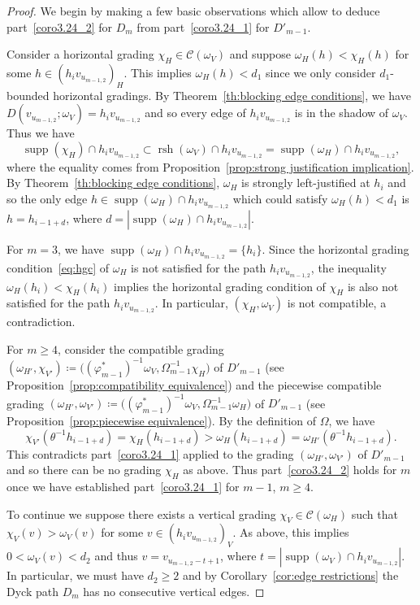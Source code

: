 \documentclass[10pt]{amsart}
\theoremstyle{definition}
\newcommand{\cC}{\mathcal{C}}
\DeclareMathOperator{\supp}{supp}
\DeclareMathOperator{\rsh}{rsh}
\begin{document}
\begin{proof}
 We begin by making a few basic observations which allow to deduce part~\ref{coro3.24_2} for $D_m$ from part~\ref{coro3.24_1} for $D'_{m-1}$.
 
 Consider a horizontal grading $\chi_H\in\cC(\omega_V)$ and suppose $\omega_H(h)<\chi_H(h)$ for some $h\in(h_iv_{u_{m-1,2}})_H$.
 This implies $\omega_H(h)<d_1$ since we only consider $d_1$-bounded horizontal gradings.
 By Theorem~\ref{th:blocking edge conditions}, we have $D(v_{u_{m-1,2}};\omega_V)=h_iv_{u_{m-1,2}}$ and so every edge of $h_iv_{u_{m-1,2}}$ is in the shadow of $\omega_V$.
 Thus we have 
 \[\supp(\chi_H)\cap h_iv_{u_{m-1,2}}\subset\rsh(\omega_V)\cap h_iv_{u_{m-1,2}}=\supp(\omega_H)\cap h_iv_{u_{m-1,2}},\]
 where the equality comes from Proposition~\ref{prop:strong justification implication}.
 By Theorem~\ref{th:blocking edge conditions}, $\omega_H$ is strongly left-justified at $h_i$ and so the only edge $h\in\supp(\omega_H)\cap h_iv_{u_{m-1,2}}$ which could satisfy $\omega_H(h)<d_1$ is $h=h_{i-1+d}$, where $d=|\supp(\omega_H)\cap h_iv_{u_{m-1,2}}|$.

 For $m=3$, we have $\supp(\omega_H)\cap h_iv_{u_{m-1,2}}=\{h_i\}$.
 Since the horizontal grading condition~\eqref{eq:hgc} of $\omega_H$ is not satisfied for the path $h_iv_{u_{m-1,2}}$, the inequality $\omega_H(h_i)<\chi_H(h_i)$ implies the horizontal grading condition of $\chi_H$ is also not satisfied for the path $h_iv_{u_{m-1,2}}$.
 In particular, $(\chi_H,\omega_V)$ is not compatible, a contradiction. 
 
 For $m\ge4$, consider the compatible grading $(\omega_{H'},\chi_{V'})\coloneqq \big((\varphi^*_{m-1})^{-1}\omega_V,\Omega_{m-1}^{-1}\chi_H\big)$ of $D'_{m-1}$ (see Proposition~\ref{prop:compatibility equivalence}) and the piecewise compatible grading $(\omega_{H'},\omega_{V'})\coloneqq \big((\varphi^*_{m-1})^{-1}\omega_V,\Omega_{m-1}^{-1}\omega_H\big)$ of $D'_{m-1}$ (see Proposition~\ref{prop:piecewise equivalence}).
 By the definition of $\Omega$, we have
 \[\chi_{V'}(\theta^{-1}h_{i-1+d})=\chi_H(h_{i-1+d})>\omega_H(h_{i-1+d})=\omega_{H'}(\theta^{-1}h_{i-1+d}).\]
 This contradicts part~\ref{coro3.24_1} applied to the grading $(\omega_{H'},\omega_{V'})$ of $D'_{m-1}$ and so there can be no grading $\chi_H$ as above.
 Thus part~\ref{coro3.24_2} holds for $m$ once we have established part~\ref{coro3.24_1} for $m-1$, $m\ge4$.

 To continue we suppose there exists a vertical grading $\chi_V\in\cC(\omega_H)$ such that $\chi_V(v)>\omega_V(v)$ for some $v\in(h_iv_{u_{m-1,2}})_V$.
 As above, this implies $0<\omega_V(v)<d_2$ and thus $v=v_{u_{m-1,2}-t+1}$, where $t=|\supp(\omega_V)\cap h_iv_{u_{m-1,2}}|$.
 In particular, we must have $d_2\ge2$ and by Corollary~\ref{cor:edge restrictions} the Dyck path $D_m$ has no consecutive vertical edges.
 

\end{proof}
\end{document}
